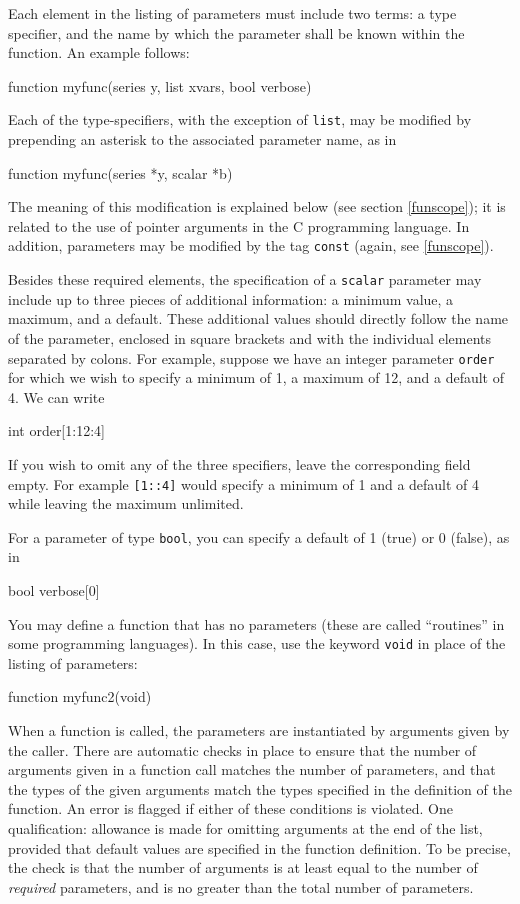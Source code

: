 Each element in the listing of parameters must include two terms: a
type specifier, and the name by which the parameter shall be known
within the function.  An example follows:
%    
\begin{code}
      function myfunc(series y, list xvars, bool verbose)
\end{code}

Each of the type-specifiers, with the exception of \texttt{list}, may
be modified by prepending an asterisk to the associated parameter
name, as in
%    
\begin{code}
      function myfunc(series *y, scalar *b)
\end{code}

The meaning of this modification is explained below (see section
\ref{funscope}); it is related to the use of pointer arguments in the
C programming language.  In addition, parameters may be modified by
the tag \texttt{const} (again, see \ref{funscope}).

Besides these required elements, the specification of a
\texttt{scalar} parameter may include up to three pieces of additional
information: a minimum value, a maximum, and a default.  These
additional values should directly follow the name of the parameter,
enclosed in square brackets and with the individual elements separated
by colons.  For example, suppose we have an integer parameter
\texttt{order} for which we wish to specify a minimum of 1, a maximum
of 12, and a default of 4.  We can write
%    
\begin{code}
      int order[1:12:4]
\end{code} 
%
If you wish to omit any of the three specifiers, leave the
corresponding field empty.  For example \texttt{[1::4]} would specify
a minimum of 1 and a default of 4 while leaving the maximum
unlimited.  

For a parameter of type \texttt{bool}, you can specify a default of
1 (true) or 0 (false), as in
%    
\begin{code}
      bool verbose[0]
\end{code} 
%

You may define a function that has no parameters (these are called
``routines'' in some programming languages).  In this case,  
use the keyword \texttt{void} in place of the listing of parameters:
%    
\begin{code}
      function myfunc2(void)
\end{code}

When a function is called, the parameters are instantiated by
arguments given by the caller.  There are automatic checks in place to
ensure that the number of arguments given in a function call matches
the number of parameters, and that the types of the given arguments
match the types specified in the definition of the function.  An error
is flagged if either of these conditions is violated.  One
qualification: allowance is made for omitting arguments at the end of
the list, provided that default values are specified in the function
definition.  To be precise, the check is that the number of arguments
is at least equal to the number of \textit{required} parameters, and
is no greater than the total number of parameters.

